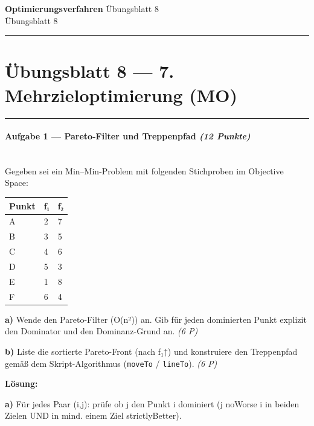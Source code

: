 \documentclass[11pt, a4paper]{article}
\providecommand{\nichttitle}{Übungsblatt}
\providecommand{\nichtsubtitle}{}
\renewcommand{\nichttitle}{Optimierungsverfahren}
\renewcommand{\nichtsubtitle}{Übungsblatt 8}
\begin{document}
\begin{center}
{\Large\bfseries\color{accent}\nichttitle}
\ifx\nichtsubtitle\empty\else
  \\[2pt]{\normalsize\color{accent!80!black}\nichtsubtitle}
\fi
\\[2pt]
\color{accent}\rule{0.4\linewidth}{0.8pt}\color{black}
\end{center}
\vspace{4pt}


\section{Übungsblatt 8 — 7. Mehrzieloptimierung (MO)}


\noindent\textcolor{rulegray}{\rule{\linewidth}{0.4pt}}


\paragraph{Aufgabe 1 — Pareto-Filter und Treppenpfad \textit{(12 Punkte)}}\mbox{}\\[2pt]

Gegeben sei ein Min–Min-Problem mit folgenden Stichproben im Objective Space:



{\small
\begin{tabularx}{\linewidth}{XXX}
\hline
\rowcolor{tableheadbg}
{\color{white}\textbf{Punkt}} & {\color{white}\textbf{f₁}} & {\color{white}\textbf{f₂}} \\[2pt]
\hline
\endhead
\hline
\endfoot
A & 2 & 7 \\
B & 3 & 5 \\
C & 4 & 6 \\
D & 5 & 3 \\
E & 1 & 8 \\
F & 6 & 4 \\
\end{tabularx}
}


\textbf{a)} Wende den Pareto-Filter (O(n²)) an. Gib für jeden dominierten Punkt explizit den Dominator und den Dominanz-Grund an. \textit{(6 P)}


\textbf{b)} Liste die sortierte Pareto-Front (nach f₁↑) und konstruiere den Treppenpfad gemäß dem Skript-Algorithmus (\texttt{moveTo} / \texttt{lineTo}). \textit{(6 P)}


\textbf{Lösung:}


\textbf{a)} Für jedes Paar (i,j): prüfe ob j den Punkt i dominiert (j noWorse i in beiden Zielen UND in mind. einem Ziel strictlyBetter).
\end{document}
